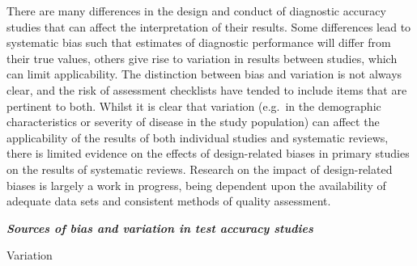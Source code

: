 \documentclass[
  11pt,
  a4paper,
  DIV=11,
  numbers=noendperiod]{scrreprt}
\begin{document}
There are many differences in the design and conduct of diagnostic
accuracy studies that can affect the interpretation of their results.
Some differences lead to systematic bias such that estimates of
diagnostic performance will differ from their true values, others give
rise to variation in results between studies, which can limit
applicability. The distinction between bias and variation is not always
clear, and the risk of assessment checklists have tended to include
items that are pertinent to both. Whilst it is clear that variation
(e.g.~in the demographic characteristics or severity of disease in the
study population) can affect the applicability of the results of both
individual studies and systematic reviews, there is limited evidence on
the effects of design-related biases in primary studies on the results
of systematic reviews. Research on the impact of design-related biases
is largely a work in progress, being dependent upon the availability of
adequate data sets and consistent methods of quality assessment.

\textbf{\emph{Sources of bias and variation in test accuracy studies}}

Variation
\end{document}
